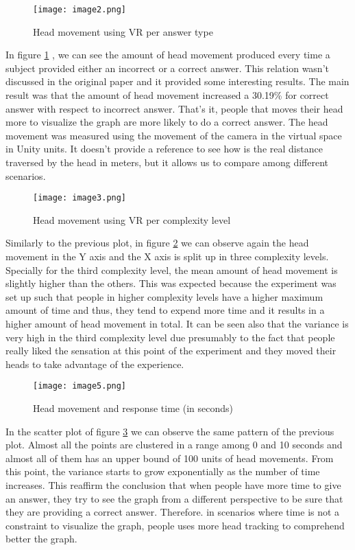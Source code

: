 \begin{figure}[!ht]
\centering
\texttt{[image: image2.png]}
\caption{Head movement using VR per answer type} \label{fig:plot2}
\end{figure}

In figure \ref{fig:plot2} , we can see the amount of head movement produced every time
a subject provided either an incorrect or a correct answer. This
relation wasn't discussed in the original paper and it provided some
interesting results. The main result was that the amount of head
movement increased a 30.19\% for correct answer with respect to
incorrect answer. That's it, people that moves their head more to
visualize the graph are more likely to do a correct answer. The head
movement was measured using the movement of the camera in the virtual
space in Unity units. It doesn't provide a reference to see how is the
real distance traversed by the head in meters, but it allows us to
compare among different scenarios.

\begin{figure}[!ht]
\centering
\texttt{[image: image3.png]}
\caption{Head movement using VR per complexity level} \label{fig:plot3}
\end{figure}

Similarly to the previous plot, in figure \ref{fig:plot3}  we can observe again the head movement in the
Y axis and the X axis is split up in three complexity levels. Specially
for the third complexity level, the mean amount of head movement is
slightly higher than the others. This was expected because the
experiment was set up such that people in higher complexity levels have
a higher maximum amount of time and thus, they tend to expend more time
and it results in a higher amount of head movement in total. It can be
seen also that the variance is very high in the third complexity level
due presumably to the fact that people really liked the sensation at
this point of the experiment and they moved their heads to take
advantage of the experience.

\begin{figure}[!ht]
\centering
\texttt{[image: image5.png]}
\caption{Head movement and response time (in seconds)} \label{fig:plot5}
\end{figure}

In the scatter plot of figure \ref{fig:plot5} we can observe the same pattern of the previous
plot. Almost all the points are clustered in a range among 0 and 10
seconds and almost all of them has an upper bound of 100 units of head
movements. From this point, the variance starts to grow exponentially as
the number of time increases. This reaffirm the conclusion that when
people have more time to give an answer, they try to see the graph from
a different perspective to be sure that they are providing a correct
answer. Therefore. in scenarios where time is not a constraint to
visualize the graph, people uses more head tracking to comprehend better
the graph.

